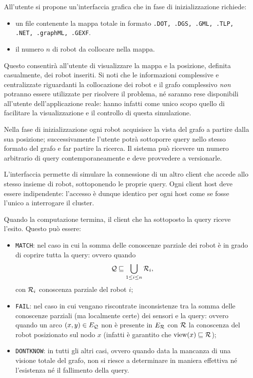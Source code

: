All'utente si propone un'interfaccia grafica che in
fase di inizializzazione richiede:
\begin{itemize}
\item un file contenente la mappa totale in formato
      \texttt{.DOT, .DGS, .GML, .TLP, .NET, .graphML, .GEXF}.
\item il numero $n$ di robot da collocare nella mappa.
\end{itemize}
Questo consentirà all'utente di visualizzare la mappa e la posizione,
definita casualmente, dei robot inseriti. Si noti che le
informazioni complessive e centralizzate riguardanti la collocazione
dei robot e il grafo complessivo \emph{non} potranno essere
utilizzate per risolvere il problema, né saranno rese disponibili
all'utente dell'applicazione reale: hanno infatti come unico scopo
quello di facilitare la visualizzazione e il controllo di
questa simulazione.

Nella fase di inizializzazione ogni robot acquisisce la vista del
grafo a partire dalla sua posizione;
successivamente l'utente potrà sottoporre query nello stesso formato
del grafo e far partire la ricerca.
Il sistema può ricevere un numero arbitrario di query
contemporaneamente e deve provvedere a versionarle.

L'interfaccia permette di simulare la connessione di un altro
client che accede allo stesso insieme di robot, sottoponendo
le proprie query. Ogni client host deve essere indipendente:
l'accesso è dunque identico per ogni host come se fosse l'unico a
interrogare il cluster.

Quando la computazione termina, il client che ha sottoposto la
query riceve l'esito. Questo può essere:
\begin{itemize}
\item \texttt{MATCH}: nel caso in cui la somma delle conoscenze
parziale dei robot è in grado di coprire tutta la query: ovvero quando \[
\mathcal{Q} \sqsubseteq \bigcup_{1 \leq i \leq n} \mathcal{R}_i, \]
con $\mathcal{R}_i$ conoscenza parziale del robot $i$;
\item \texttt{FAIL}: nel caso in cui vengano riscontrate inconsistenze
tra la somma delle conoscenze parziali (ma localmente certe)
dei sensori e la query: ovvero quando un arco $(x, y) \in E_{\mathcal{Q}}$
non è presente in $E_{\mathcal{R}}$ con $\mathcal{R}$ la conoscenza del robot posizionato
sul nodo $x$ (infatti è garantito che $\mathrm{view}(x) \sqsubseteq \mathcal{R}$);
\item \texttt{DONTKNOW}: in tutti gli altri casi, ovvero quando
data la mancanza di una visione totale del grafo,
non si riesce a determinare in maniera effettiva né l'esistenza né
il fallimento della query.
\end{itemize}

